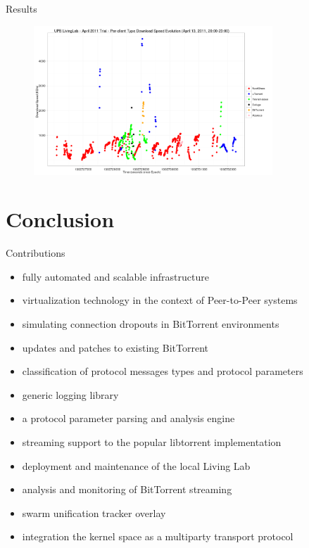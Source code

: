 \documentclass{beamer}
\begin{document}
\begin{frame}{Results}
  \begin{figure}
    \includegraphics[width=0.8\textwidth]{img/ll-trial}
  \end{figure}
\end{frame}

\section{Conclusion}

\begin{frame}{Contributions}
  \begin{itemize}
    \item fully automated and scalable infrastructure
    \item virtualization technology in the context of Peer-to-Peer systems
    \item simulating connection dropouts in BitTorrent environments
    \item updates and patches to existing BitTorrent
    \item classification of protocol messages types and protocol parameters
    \item generic logging library
    \item a protocol parameter parsing and analysis engine
    \item streaming support to the popular libtorrent implementation
    \item deployment and maintenance of the local Living Lab
    \item analysis and monitoring of BitTorrent streaming
    \item swarm unification tracker overlay
    \item integration the kernel space as a multiparty transport protocol
  \end{itemize}
\end{frame}
\end{document}
